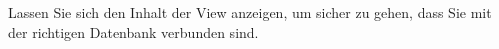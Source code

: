     \item Lassen Sie sich den Inhalt der View  anzeigen, um sicher zu gehen, dass Sie mit der richtigen Datenbank verbunden sind.
